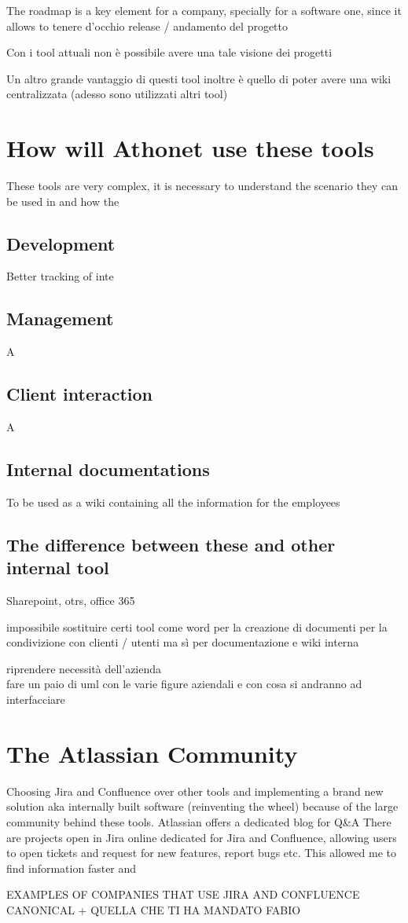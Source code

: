 	The roadmap is a key element for a company, specially for a software one, since it allows to tenere d'occhio release / andamento del progetto

	Con i tool attuali non è possibile avere una tale visione dei progetti
	
	Un altro grande vantaggio di questi tool inoltre è quello di poter avere una wiki centralizzata (adesso sono utilizzati altri tool)

\section{How will Athonet use these tools}

	These tools are very complex, it is necessary to understand the scenario they can be used in and how the

	\subsection{Development} 
		Better tracking of inte
	
	\subsection{Management} 
		A
	
	\subsection{Client interaction} 
		A
		
	\subsection{Internal documentations}
		To be used as a wiki containing all the information for the employees
		
	\subsection{The difference between these and other internal tool}
		Sharepoint, otrs, office 365
		
		impossibile sostituire certi tool come word per la creazione di documenti per la condivizione con clienti / utenti ma sì per documentazione e wiki interna

riprendere necessità dell'azienda\\
fare un paio di uml con le varie figure aziendali e con cosa si andranno ad interfacciare

\section{The Atlassian Community}
	Choosing Jira and Confluence over other tools and implementing a brand new solution aka internally built software (reinventing the wheel) 
	because of the large community behind these tools.
	Atlassian offers a dedicated blog for Q\&A
	There are projects open in Jira online dedicated for Jira and Confluence, allowing users to open tickets and request for new features, report bugs etc.
	This allowed me to find information faster and 
	
	
	EXAMPLES OF COMPANIES THAT USE JIRA AND CONFLUENCE 
	CANONICAL
	+ QUELLA CHE TI HA MANDATO FABIO
